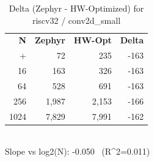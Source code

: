 \begin{table}[tb]
    \centering
    \caption{Delta (Zephyr - HW-Optimized) for riscv32 / conv2d_small}
    \label{tab:delta_riscv32_conv2d_small}
    \scriptsize
    \begin{tabular}{r r r r}
        \hline
        \textbf{N} & \textbf{Zephyr} & \textbf{HW-Opt} & \textbf{Delta} \\\n+        \hline
        4 & 72 & 235 & -163\\
        16 & 163 & 326 & -163\\
        64 & 528 & 691 & -163\\
        256 & 1,987 & 2,153 & -166\\
        1024 & 7,829 & 7,991 & -162\\
        \hline
    \end{tabular}
    \vspace{2mm}\\\n    Slope vs log2(N): -0.050 \ (R^2=0.011)\n\end{table}
